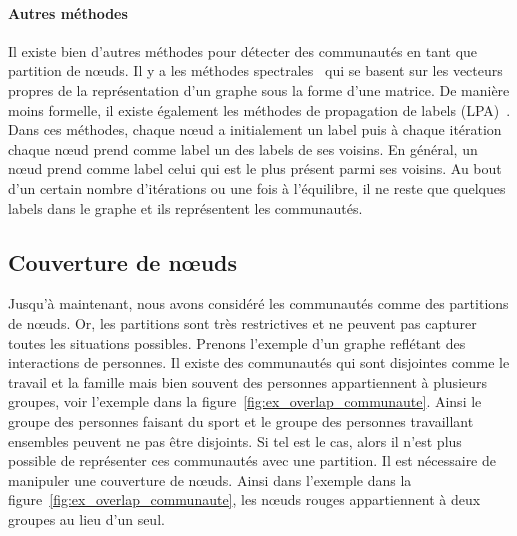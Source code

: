 \paragraph{Autres méthodes}
Il existe bien d'autres méthodes pour détecter des communautés en tant que partition de n\oe uds.
Il y a les méthodes spectrales~\cite{Donetti2004,Mitrovic2009} qui se basent sur les vecteurs propres de la représentation d'un graphe sous la forme d'une matrice.
De manière moins formelle, il existe également les méthodes de propagation de labels (LPA)~\cite{Raghavan2007a,Li2014c}.
Dans ces méthodes, chaque n\oe ud a initialement un label puis à chaque itération chaque n\oe ud prend comme label un des labels de ses voisins.
En général, un n\oe ud prend comme label celui qui est le plus présent parmi ses voisins.
Au bout d'un certain nombre d'itérations ou une fois à l'équilibre, il ne reste que quelques labels dans le graphe et ils représentent les communautés.



\subsection{Couverture de n\oe uds}
\label{subsec:cover}
Jusqu'à maintenant, nous avons considéré les communautés comme des partitions de n\oe uds.
Or, les partitions sont très restrictives et ne peuvent pas capturer toutes les situations possibles.
Prenons l'exemple d'un graphe reflétant des interactions de personnes.
Il existe des communautés qui sont disjointes comme le travail et la famille mais bien souvent des personnes appartiennent à plusieurs groupes, voir l'exemple dans la figure~\ref{fig:ex_overlap_communaute}.
Ainsi le groupe des personnes faisant du sport et le groupe des personnes travaillant ensembles peuvent ne pas être disjoints.
Si tel est le cas, alors il n'est plus possible de représenter ces communautés avec une partition.
Il est nécessaire de manipuler une couverture de n\oe uds.
Ainsi dans l'exemple dans la figure~\ref{fig:ex_overlap_communaute}, les n\oe uds rouges appartiennent à deux groupes au lieu d'un seul.

